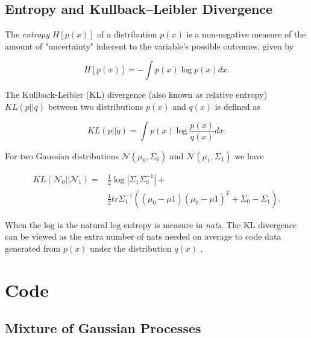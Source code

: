\documentclass[12pt,a4paper]{report}
\theoremstyle{definition}
\begin{document}
\section{Entropy and Kullback–Leibler Divergence} \label{sec:KLDiv}

The \emph{entropy} $H[p(x)]$ of a distribution $p(x)$ is a non-negative measure of the amount of "uncertainty" inherent to the variable's possible outcomes, given by

\begin{equation}
	H[p(x)]  = - \int p(x) \log p(x) dx.
\end{equation}

The Kullback-Leibler (KL) divergence (also known as relative entropy) $KL(p || q)$ between two distributions $p(x)$ and $q(x)$ is defined as 

\begin{equation}
	KL(p || q) = \int p(x) \log \frac{p(x)}{q(x)} dx.
\end{equation}

For two Gaussian distributions $\mathcal{N}(\mu_{0}, \Sigma_{0})$ and $\mathcal{N}(\mu_{1}, \Sigma_{1})$ we have

\begin{equation}
	\begin{aligned}
		KL(\mathcal{N}_{0} || \mathcal{N}_{1}) = &\frac{1}{2} \log |\Sigma_{1}\Sigma_{0}^{-1}| + \\
		&\frac{1}{2} tr \Sigma_{1}^{-1} ((\mu_{0} - \mu{1})(\mu_{0} - \mu{1})^T  + \Sigma_{0} - \Sigma_{1}).
	\end{aligned}
\end{equation}

When the log is the natural log entropy is measure in \emph{nats}. The KL divergence can be viewed as the extra number of nats needed on average to code data generated from $p(x)$ under the distribution $q(x)$ \citep{RasmussenWilliams2006}.

\chapter{Code}

\section{Mixture of Gaussian Processes}
\end{document}
